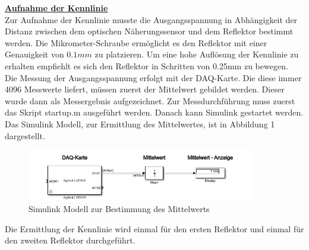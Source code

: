 \documentclass[a4paper,12pt]{article}
\begin{document}
	\noindent
	\underline{\textbf{Aufnahme der Kennlinie}} \\ \newline
	Zur Aufnahme der Kennlinie musste die Ausgangsspannung in Abhängigkeit der Distanz zwischen dem optischen Näherungssensor und dem Reflektor bestimmt werden.\newline
	Die Mikrometer-Schraube ermöglicht es den Reflektor mit einer Genauigkeit von $0.1mm$ zu platzieren. Um eine hohe Auflösung der Kennlinie zu erhalten empfiehlt es sich den Reflektor in Schritten von 0.25mm zu bewegen.\\ \newline
	Die Messung der Ausgangsspannung erfolgt mit der DAQ-Karte. Die diese immer 4096 Messwerte liefert, müssen zuerst der Mittelwert gebildet werden. Dieser wurde dann als Messergebnis aufgezeichnet.\newline
	Zur Messdurchführung muss zuerst das Skript startup.m ausgeführt werden. Danach kann Simulink gestartet werden.\newline
	Das Simulink Modell, zur Ermittlung des Mittelwertes, ist in Abbildung 1 dargestellt.
	\begin{figure}[h]
		\centering
		\includegraphics[width=10cm]{assets/kennlinie_aufbau}
		\caption{Simulink Modell zur Bestimmung des Mittelwerts}
	\end{figure}\newline
	Die Ermittlung der Kennlinie wird einmal für den ersten Reflektor und einmal für den zweiten Reflektor durchgeführt.\newline
\end{document}

